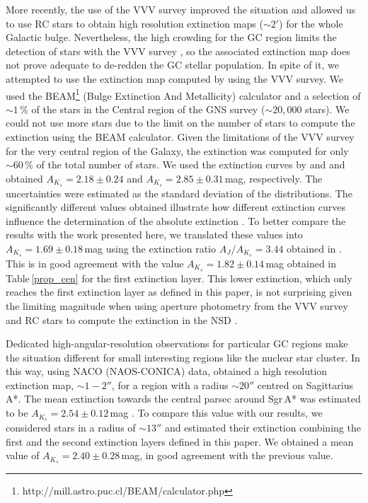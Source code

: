 \documentclass{aa}
\begin{document}
More recently, the use of the VVV survey \citep{Minniti:2010fk,Saito:2012ml} improved the situation and allowed us to use RC stars to obtain high resolution extinction maps ($\sim2'$) for the whole Galactic bulge. Nevertheless, the high crowding for the GC region limits the detection of stars with the VVV survey \citep[see Fig.\,12 in ][]{Nogueras-Lara:2019aa}, so the associated extinction map does not prove adequate to de-redden the GC stellar population. In spite of it, we attempted to use the extinction map computed by \citet{Gonzalez:2012aa} using the VVV survey. We used the BEAM\footnote{http://mill.astro.puc.cl/BEAM/calculator.php} (Bulge Extinction And Metallicity) calculator and a selection of $\sim1$\,\% of the stars in the Central region of the GNS survey ($\sim20,000$ stars). We could not use more stars due to  the limit on the number of stars to compute the extinction using the BEAM calculator. Given the limitations of the VVV survey for the very central region of the Galaxy, the extinction was computed for only  $\sim 60$\,\% of the total number of stars. We used the extinction curves by \citet{Nishiyama:2009ph} and \citet{Cardelli:1989kx} and obtained $A_{K_s}=2.18\pm0.24$ and $A_{K_s}=2.85\pm0.31$\,mag, respectively. The uncertainties were estimated as the standard deviation of the distributions. The significantly different values obtained illustrate how different extinction curves influence the determination of the absolute extinction \citep[e.g.][]{Nogueras-Lara:2019ac}. To better compare the results with the work presented here, we translated these values into $A_{K_s}=1.69\pm0.18$\,mag using the extinction ratio $A_J/A_{K_s}=3.44$ obtained in \citet{Nogueras-Lara:2020aa}. This is in good agreement with the value $A_{K_s}=1.82\pm0.14$\,mag obtained in Table\,\ref{prop_cen} for the first extinction layer. This lower extinction, which only reaches the first extinction layer as defined in this paper, is not surprising given the limiting magnitude when using aperture photometry from the VVV survey and RC stars to compute the extinction in the NSD \citep[see Fig.\,12 in ][]{Nogueras-Lara:2019aa}.






Dedicated high-angular-resolution observations for particular GC regions make the situation different for small interesting regions like the nuclear star cluster. In this way, using NACO (NAOS-CONICA) data, \citet{Schodel:2010fk} obtained a high resolution extinction map, $\sim1-2''$, for a region with a radius $\sim20''$ centred on Sagittarius\,A*. The mean extinction towards the central parsec around Sgr\,A* was estimated to be $A_{K_s}=2.54\pm0.12$\,mag \citep{Schodel:2010fk}. To compare this value with our results, we considered stars in a radius of $\sim 13''$ and estimated their extinction combining the first and the second extinction layers defined in this paper. We obtained a mean value of $A_{K_s}=2.40\pm0.28$\,mag, in good agreement with the previous value.
\end{document}
